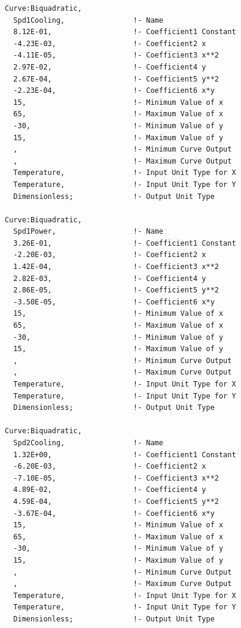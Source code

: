 \begin{lstlisting}
Curve:Biquadratic,
  Spd1Cooling,                !- Name
  8.12E-01,                   !- Coefficient1 Constant
  -4.23E-03,                  !- Coefficient2 x
  -4.11E-05,                  !- Coefficient3 x**2
  2.97E-02,                   !- Coefficient4 y
  2.67E-04,                   !- Coefficient5 y**2
  -2.23E-04,                  !- Coefficient6 x*y
  15,                         !- Minimum Value of x
  65,                         !- Maximum Value of x
  -30,                        !- Minimum Value of y
  15,                         !- Maximum Value of y
  ,                           !- Minimum Curve Output
  ,                           !- Maximum Curve Output
  Temperature,                !- Input Unit Type for X
  Temperature,                !- Input Unit Type for Y
  Dimensionless;              !- Output Unit Type

Curve:Biquadratic,
  Spd1Power,                  !- Name
  3.26E-01,                   !- Coefficient1 Constant
  -2.20E-03,                  !- Coefficient2 x
  1.42E-04,                   !- Coefficient3 x**2
  2.82E-03,                   !- Coefficient4 y
  2.86E-05,                   !- Coefficient5 y**2
  -3.50E-05,                  !- Coefficient6 x*y
  15,                         !- Minimum Value of x
  65,                         !- Maximum Value of x
  -30,                        !- Minimum Value of y
  15,                         !- Maximum Value of y
  ,                           !- Minimum Curve Output
  ,                           !- Maximum Curve Output
  Temperature,                !- Input Unit Type for X
  Temperature,                !- Input Unit Type for Y
  Dimensionless;              !- Output Unit Type

Curve:Biquadratic,
  Spd2Cooling,                !- Name
  1.32E+00,                   !- Coefficient1 Constant
  -6.20E-03,                  !- Coefficient2 x
  -7.10E-05,                  !- Coefficient3 x**2
  4.89E-02,                   !- Coefficient4 y
  4.59E-04,                   !- Coefficient5 y**2
  -3.67E-04,                  !- Coefficient6 x*y
  15,                         !- Minimum Value of x
  65,                         !- Maximum Value of x
  -30,                        !- Minimum Value of y
  15,                         !- Maximum Value of y
  ,                           !- Minimum Curve Output
  ,                           !- Maximum Curve Output
  Temperature,                !- Input Unit Type for X
  Temperature,                !- Input Unit Type for Y
  Dimensionless;              !- Output Unit Type


\end{lstlisting}

